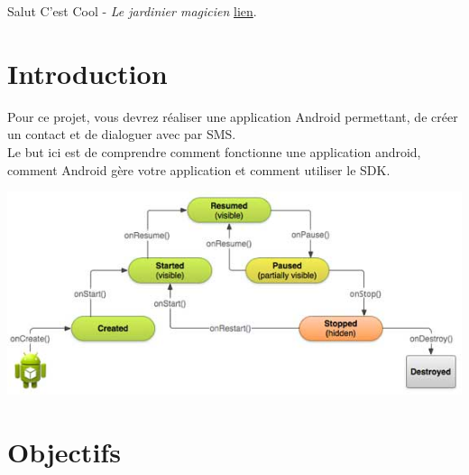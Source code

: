 \documentclass{42}
\begin{document}
	Salut C'est Cool - \textit{Le jardinier magicien}
	\href{https://www.youtube.com/watch?v=CoCyOX59bhI}{lien}.

\chapter{Introduction}

	Pour ce projet, vous devrez r\'ealiser une application Android permettant,
	de cr\'eer un contact et de dialoguer avec par SMS.\\
	
	\vspace{5mm}
	Le but ici est de comprendre comment fonctionne une application android,
	comment Android g\`ere votre application et comment utiliser le SDK.

	\begin{center}
	\includegraphics[scale=0.70]{android_activity_lifecycle}
	\end{center}

\chapter{Objectifs}
\end{document}
